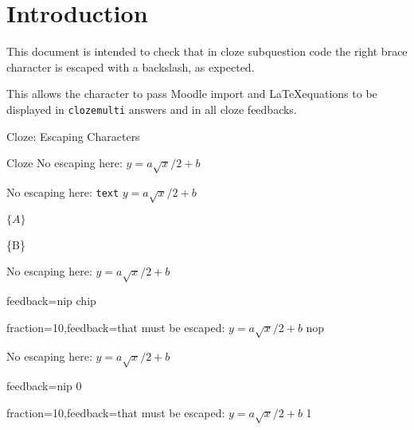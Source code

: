 \documentclass{article}
\def\myequation{y=a\sqrt{x}/2+{b}}
\begin{document}
\section*{Introduction}

This document is intended to check that in cloze subquestion code the right 
brace character is escaped with a backslash, as expected.

This allows the character to pass Moodle import and \LaTeX equations to be 
displayed in \texttt{clozemulti} answers and in all cloze feedbacks.

\begin{quiz}{Cloze: Escaping Characters}

\begin{cloze}{Cloze}
No escaping here: $\myequation$

\begin{multi}[points=4,vertical,shuffle=false]
No escaping here: \texttt{text} $\myequation$
\item* $\lbrace A\rbrace$
\item \{B\}
\end{multi}

\begin{shortanswer}
{No escaping here: } $\myequation$
\item[feedback={nip}] chip
\item[fraction=10,feedback={that must be escaped: $\myequation$}] nop
\end{shortanswer}

\begin{numerical}
{No escaping here: } $\myequation$
\item[feedback={nip}] 0
\item[fraction=10,feedback={that must be escaped: $\myequation$}] 1
\end{numerical}

\end{cloze}

\end{quiz}
\end{document}
